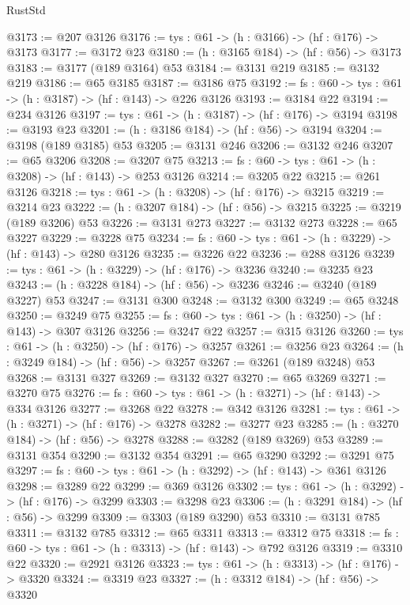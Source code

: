 \begin{lexlean}{RustStd}
\begin{coremodule}
{\begin{coremodule}
{{{{{{{{{{{{@3173 := @207 @3126
@3176 := {tys : @61} -> (h : @3166) -> (hf : @176) -> @3173
@3177 := @3172 @23
@3180 := (h : @3165 @184) -> (hf : @56) -> @3173
@3183 := @3177 (@189 @3164) @53
@3184 := @3131 @219
@3185 := @3132 @219
@3186 := @65 @3185
@3187 := @3186 @75
@3192 := {fs : @60} -> {tys : @61} -> (h : @3187) -> (hf : @143) -> @226 @3126
@3193 := @3184 @22
@3194 := @234 @3126
@3197 := {tys : @61} -> (h : @3187) -> (hf : @176) -> @3194
@3198 := @3193 @23
@3201 := (h : @3186 @184) -> (hf : @56) -> @3194
@3204 := @3198 (@189 @3185) @53
@3205 := @3131 @246
@3206 := @3132 @246
@3207 := @65 @3206
@3208 := @3207 @75
@3213 := {fs : @60} -> {tys : @61} -> (h : @3208) -> (hf : @143) -> @253 @3126
@3214 := @3205 @22
@3215 := @261 @3126
@3218 := {tys : @61} -> (h : @3208) -> (hf : @176) -> @3215
@3219 := @3214 @23
@3222 := (h : @3207 @184) -> (hf : @56) -> @3215
@3225 := @3219 (@189 @3206) @53
@3226 := @3131 @273
@3227 := @3132 @273
@3228 := @65 @3227
@3229 := @3228 @75
@3234 := {fs : @60} -> {tys : @61} -> (h : @3229) -> (hf : @143) -> @280 @3126
@3235 := @3226 @22
@3236 := @288 @3126
@3239 := {tys : @61} -> (h : @3229) -> (hf : @176) -> @3236
@3240 := @3235 @23
@3243 := (h : @3228 @184) -> (hf : @56) -> @3236
@3246 := @3240 (@189 @3227) @53
@3247 := @3131 @300
@3248 := @3132 @300
@3249 := @65 @3248
@3250 := @3249 @75
@3255 := {fs : @60} -> {tys : @61} -> (h : @3250) -> (hf : @143) -> @307 @3126
@3256 := @3247 @22
@3257 := @315 @3126
@3260 := {tys : @61} -> (h : @3250) -> (hf : @176) -> @3257
@3261 := @3256 @23
@3264 := (h : @3249 @184) -> (hf : @56) -> @3257
@3267 := @3261 (@189 @3248) @53
@3268 := @3131 @327
@3269 := @3132 @327
@3270 := @65 @3269
@3271 := @3270 @75
@3276 := {fs : @60} -> {tys : @61} -> (h : @3271) -> (hf : @143) -> @334 @3126
@3277 := @3268 @22
@3278 := @342 @3126
@3281 := {tys : @61} -> (h : @3271) -> (hf : @176) -> @3278
@3282 := @3277 @23
@3285 := (h : @3270 @184) -> (hf : @56) -> @3278
@3288 := @3282 (@189 @3269) @53
@3289 := @3131 @354
@3290 := @3132 @354
@3291 := @65 @3290
@3292 := @3291 @75
@3297 := {fs : @60} -> {tys : @61} -> (h : @3292) -> (hf : @143) -> @361 @3126
@3298 := @3289 @22
@3299 := @369 @3126
@3302 := {tys : @61} -> (h : @3292) -> (hf : @176) -> @3299
@3303 := @3298 @23
@3306 := (h : @3291 @184) -> (hf : @56) -> @3299
@3309 := @3303 (@189 @3290) @53
@3310 := @3131 @785
@3311 := @3132 @785
@3312 := @65 @3311
@3313 := @3312 @75
@3318 := {fs : @60} -> {tys : @61} -> (h : @3313) -> (hf : @143) -> @792 @3126
@3319 := @3310 @22
@3320 := @2921 @3126
@3323 := {tys : @61} -> (h : @3313) -> (hf : @176) -> @3320
@3324 := @3319 @23
@3327 := (h : @3312 @184) -> (hf : @56) -> @3320
}}}}}}}}}}}}
\end{coremodule}}
\end{coremodule}
\end{lexlean}
